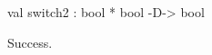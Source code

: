 \runverbatimtrue
{}
\begin{RunVerbatimMsg}
val switch2 : bool * bool -D-> bool
\end{RunVerbatimMsg}
\begin{RunVerbatimErr}
Success.
\end{RunVerbatimErr}

